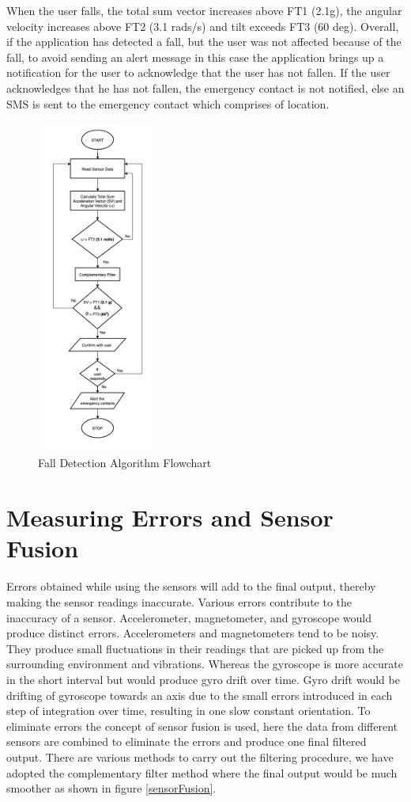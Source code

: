 \documentclass[conference]{IEEEtran}
\begin{document}
When the user falls, the total sum vector increases above FT1 (2.1g), the angular velocity increases above FT2 (3.1 rads/s) and tilt exceeds FT3 (60 deg). Overall, if the application has detected a fall, but the user was not affected because of the fall, to avoid sending an alert message in this case the application brings up a notification for the user to acknowledge that the user has not fallen. If the user acknowledges that he has not fallen, the emergency contact is not notified, else an SMS is sent to the emergency contact which comprises of location.

 
\begin{figure}
\centerline{\includegraphics[width=4cm, height=11cm]{Flowchart_v3.1.png}}
\caption{Fall Detection Algorithm Flowchart}
\label{fig:fallDetectAlgo}
\end{figure}

\section{Measuring Errors and Sensor Fusion}
Errors obtained while using the sensors will add to the final output, thereby making the sensor readings inaccurate. Various errors contribute to the inaccuracy of a sensor. Accelerometer, magnetometer, and gyroscope would produce distinct errors. Accelerometers and magnetometers tend to be noisy. They produce small fluctuations in their readings that are picked up from the surrounding environment and vibrations. Whereas the gyroscope is more accurate in the short interval but would produce gyro drift over time. Gyro drift would be drifting of gyroscope towards an axis due to the small errors introduced in each step of integration over time, resulting in one slow constant orientation.
To eliminate errors the concept of sensor fusion is used, here the data from different sensors are combined to eliminate the errors and produce one final filtered output. There are various methods to carry out the filtering procedure, we have adopted the complementary filter method where the final output would be much smoother as shown in figure \ref{sensorFusion}.
\end{document}
